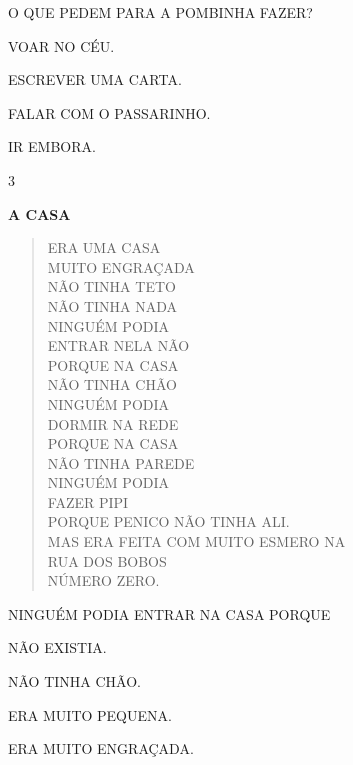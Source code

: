 
O QUE PEDEM PARA A POMBINHA FAZER?

\begin{escolha}
\item VOAR NO CÉU.

\item ESCREVER UMA CARTA.

\item FALAR COM O PASSARINHO.

\item IR EMBORA. 
\end{escolha}

\num{3}

\textbf{A CASA}

\begin{verse}
ERA UMA CASA\\
MUITO ENGRAÇADA\\
NÃO TINHA TETO\\
NÃO TINHA NADA\\
NINGUÉM PODIA\\
ENTRAR NELA NÃO\\
PORQUE NA CASA\\
NÃO TINHA CHÃO\\
NINGUÉM PODIA\\
DORMIR NA REDE\\
PORQUE NA CASA\\
NÃO TINHA PAREDE\\
NINGUÉM PODIA\\
FAZER PIPI\\
PORQUE PENICO NÃO TINHA ALI.\\
MAS ERA FEITA COM MUITO ESMERO NA\\
RUA DOS BOBOS\\
NÚMERO ZERO.
\end{verse}


NINGUÉM PODIA ENTRAR NA CASA PORQUE

\begin{escolha}
\item NÃO EXISTIA.

\item NÃO TINHA CHÃO.

\item ERA MUITO PEQUENA.

\item ERA MUITO ENGRAÇADA.
\end{escolha}

